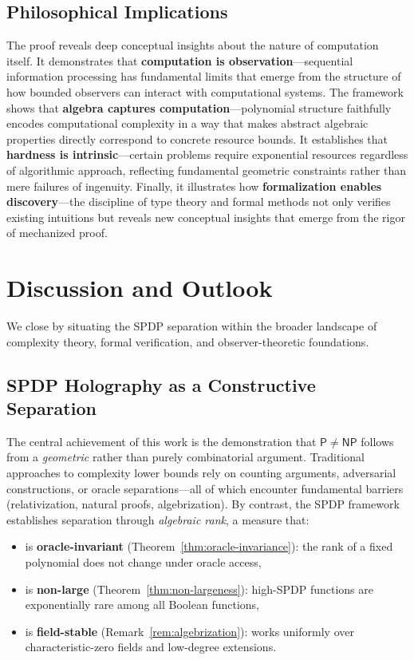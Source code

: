 \documentclass[12pt]{article}
\theoremstyle{definition}
\theoremstyle{definition}
\theoremstyle{remark}
\theoremstyle{remark}
\begin{document}
\subsection{Philosophical Implications}

The proof reveals deep conceptual insights about the nature of computation itself. It demonstrates that \textbf{computation is observation}---sequential information processing has fundamental limits that emerge from the structure of how bounded observers can interact with computational systems. The framework shows that \textbf{algebra captures computation}---polynomial structure faithfully encodes computational complexity in a way that makes abstract algebraic properties directly correspond to concrete resource bounds. It establishes that \textbf{hardness is intrinsic}---certain problems require exponential resources regardless of algorithmic approach, reflecting fundamental geometric constraints rather than mere failures of ingenuity. Finally, it illustrates how \textbf{formalization enables discovery}---the discipline of type theory and formal methods not only verifies existing intuitions but reveals new conceptual insights that emerge from the rigor of mechanized proof.

\section{Discussion and Outlook}
\label{sec:discussion-outlook}

We close by situating the SPDP separation within the broader landscape of complexity theory, formal verification, and observer-theoretic foundations.

\subsection{SPDP Holography as a Constructive Separation}

The central achievement of this work is the demonstration that $\mathsf{P} \neq \mathsf{NP}$ follows from a \emph{geometric} rather than purely combinatorial argument. Traditional approaches to complexity lower bounds rely on counting arguments, adversarial constructions, or oracle separations---all of which encounter fundamental barriers (relativization, natural proofs, algebrization). By contrast, the SPDP framework establishes separation through \emph{algebraic rank}, a measure that:
\begin{itemize}
\item is \textbf{oracle-invariant} (Theorem~\ref{thm:oracle-invariance}): the rank of a fixed polynomial does not change under oracle access,
\item is \textbf{non-large} (Theorem~\ref{thm:non-largeness}): high-SPDP functions are exponentially rare among all Boolean functions,
\item is \textbf{field-stable} (Remark~\ref{rem:algebrization}): works uniformly over characteristic-zero fields and low-degree extensions.
\end{itemize}
\end{document}
